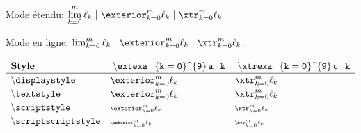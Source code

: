 \documentclass[varwidth, border = 8pt]{standalone}
\newcommand\exasep{\kern3pt | \kern3pt}
\newcommand\limexa{\lim_{k = 0}^{m} \ell_k}
\newcommand\xtrexa{\xtr_{k = 0}^{m} \ell_k}
\newcommand\extexa{\exterior_{k = 0}^{m} \ell_k}
\newcommand{\simpletest}{\extexa}
\newcommand{\verbtest}%
           {\mathmacro{extexa}\_\{k = 0\}%
            \text{\textasciicircum}\{9\} \, a\_k}
\newcommand{\simpletestbis}{\xtrexa}
\newcommand{\verbtestbis}%
           {\mathmacro{xtrexa}\_\{k = 0\}%
            \text{\textasciicircum}\{9\} \, c\_k}
\newcommand{\testmathstyle}{
  \[
    \renewcommand{\arraystretch}{1.2}%
    \begin{array}{lll}
        \textbf{Style}
      & \mathtt{\verbtest}
      & \mathtt{\verbtestbis}
      \\ \hline
        \txtmacro{displaystyle}
      & \displaystyle \simpletest
      & \displaystyle \simpletestbis
      \\
        \txtmacro{textstyle}
      & \textstyle \simpletest
      & \textstyle \simpletestbis
      \\
        \txtmacro{scriptstyle}
      & \scriptstyle \simpletest
      & \scriptstyle \simpletestbis
      \\
        \txtmacro{scriptscriptstyle}
      & \scriptscriptstyle \simpletest
      & \scriptscriptstyle \simpletestbis
    \end{array}
  \]
}
\begin{document}
Mode étendu:
$\displaystyle \limexa \exasep \extexa \exasep \xtrexa$

Mode en ligne:
$\limexa \exasep \extexa \exasep \xtrexa$.

\testmathstyle
\end{document}
